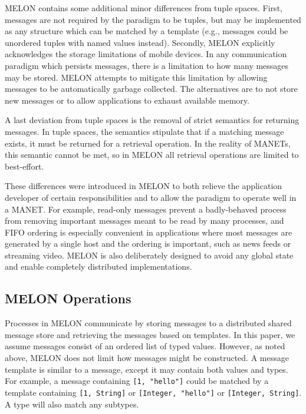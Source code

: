 \documentclass{llncs}
\begin{document}
MELON contains some additional minor differences from tuple spaces. First, messages are not required by the paradigm to be tuples, but may be implemented as any structure which can be matched by a template (e.g., messages could be unordered tuples with named values instead). Secondly, MELON explicitly acknowledges the storage limitations of mobile devices. In any communication paradigm which persists messages, there is a limitation to how many messages may be stored. MELON attempts to mitigate this limitation by allowing messages to be automatically garbage collected. The alternatives are to not store new messages or to allow applications to exhaust available memory.

A last deviation from tuple spaces is the removal of strict semantics for returning messages. In tuple spaces, the semantics stipulate that if a matching message exists, it must be returned for a retrieval operation. In the reality of MANETs, this semantic cannot be met, so in MELON all retrieval operations are limited to best-effort.

These differences were introduced in MELON to both relieve the application developer of certain responsibilities and to allow the paradigm to operate well in a MANET. For example, read-only messages prevent a badly-behaved process from removing important messages meant to be read by many processes, and FIFO ordering is especially convenient in applications where most messages are generated by a single host and the ordering is important, such as news feeds or streaming video. MELON is also deliberately designed to avoid any global state and enable completely distributed implementations.

\subsection{MELON Operations}\label{melon}

Processes in MELON communicate by storing messages to a distributed shared message store and retrieving the messages based on templates. In this paper, we assume messages consist of an ordered list of typed values. However, as noted above, MELON does not limit how messages might be constructed. A message template is similar to a message, except it may contain both values and types. For example, a message containing \texttt{[1, "hello"]} could be matched by a template containing \texttt{[1, String]} or \texttt{[Integer, "hello"]} or \texttt{[Integer, String]}. A type will also match any subtypes.
\end{document}
